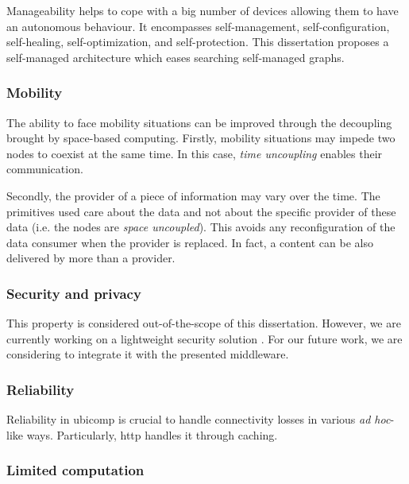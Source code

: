 Manageability helps to cope with a big number of devices allowing them to have an autonomous behaviour. %
It encompasses self-management, self-configuration, self-healing, self-optimization, and self-protection.
This dissertation proposes a self-managed architecture which eases searching self-managed graphs.


\subsubsection{Mobility}

The ability to face mobility situations can be improved through the decoupling brought by space-based computing.
Firstly, mobility situations may impede two nodes to coexist at the same time.
In this case, \emph{time uncoupling} enables their communication.

Secondly, the provider of a piece of information may vary over the time.
The primitives used care about the data and not about the specific provider of these data (i.e. the nodes are \emph{space uncoupled}).
This avoids any reconfiguration of the data consumer when the provider is replaced.
In fact, a content can be also delivered by more than a provider.


\subsubsection{Security and privacy}

This property is considered out-of-the-scope of this dissertation.
However, we are currently working on a lightweight security solution \citep{naranjo_lightweight_2012}. %
For our future work, we are considering to integrate it with the presented middleware.


\subsubsection{Reliability}

Reliability in \ac{ubicomp} is crucial to handle connectivity losses in various \emph{ad hoc}-like ways.
Particularly, \ac{http} handles it through caching.


\subsubsection{Limited computation}

